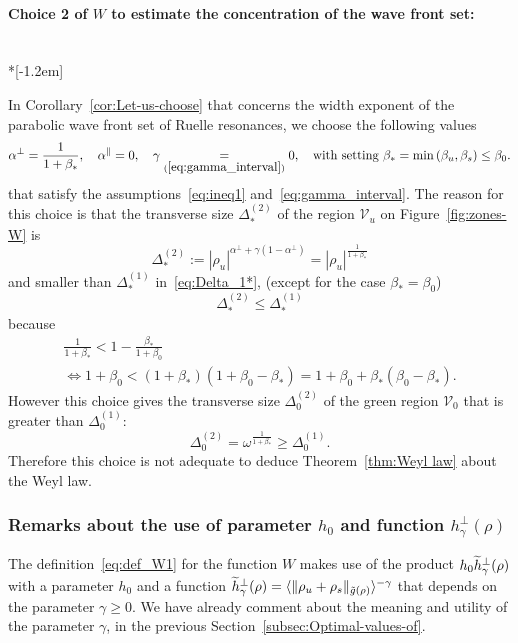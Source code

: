 \documentclass[10pt]{amsart}
\theoremstyle{definition}\newtheorem{defi}[theo]{Definition}\newtheorem{rema}[theo]{Remark}\newtheorem{exam}[theo]{Example}\newtheorem{exem}[theo]{Example}\newtheorem{nota}[theo]{Notation}
\newcommand*\eq[1]{\underset{(#1)}{=}}
\newcommand{\clV}{\mathcal{V}}
\let\oldtilde\tilde
\renewcommand*{\tilde}[1]{\mathchoice{\widetilde{#1}}{\widetilde{#1}}{\oldtilde{#1}}{\oldtilde{#1}}}
\begin{document}
\paragraph{Choice 2 of $W$ to estimate the concentration of the wave front set:}\ \\*[-1.2em]

\noindent In Corollary~\ref{cor:Let-us-choose} that concerns the width exponent of the parabolic wave front set of Ruelle resonances, we choose the following values
\begin{equation}\label{eq:choice_2}
\alpha^{\perp}=\frac{1}{1+\beta_{*}},\quad\alpha^{\parallel}=0,\quad\gamma\eq{\eqref{eq:gamma_interval}}0,\quad\text{with setting }\beta_{*}=\min\left(\beta_{u},\beta_{s}\right)\le\beta_{0}.
\end{equation}
that satisfy the assumptions~\eqref{eq:ineq1} and~\eqref{eq:gamma_interval}. The reason for this choice is that the transverse size $\Delta_{*}^{(2)}$ of the region $\clV_{u}$ on Figure~\ref{fig:zones-W} is
\begin{equation}\label{eq:size_Delta_2*}
\Delta_{*}^{\left(2\right)}:=\left|\rho_{u}\right|^{\alpha^{\perp}+\gamma\left(1-\alpha^{\perp}\right)}=\left|\rho_{u}\right|^{\frac{1}{1+\beta_{*}}}
\end{equation}
and smaller than $\Delta_{*}^{(1)}$ in~\eqref{eq:Delta_1*}, (except for the case $\beta_{*}=\beta_{0}$)
\[
\Delta_{*}^{\left(2\right)}\leq\Delta_{*}^{\left(1\right)}
\]
because
\begin{multline*}
\frac{1}{1+\beta_{*}}<1-\frac{\beta_{*}}{1+\beta_{0}}\\\Longleftrightarrow
1+\beta_{0}<(1+\beta_{*})(1+\beta_{0}-\beta_{*})=1+\beta_{0}+\beta_{*}(\beta_{0}-\beta_{*}).
\end{multline*}
However this choice gives the transverse size $\Delta_{0}^{(2)}$ of the green region $\clV_{0}$ that is greater than $\Delta_{0}^{(1)}$:
\[
\Delta_{0}^{\left(2\right)}=\omega^{\frac{1}{1+\beta_{*}}}\geq\Delta_{0}^{\left(1\right)}.
\]
Therefore this choice is not adequate to deduce Theorem~\ref{thm:Weyl law} about the Weyl law.

\subsubsection{Remarks about the use of parameter \texorpdfstring{$h_{0}$}{h0} and function \texorpdfstring{$h_{\gamma}^{\perp}\left(\rho\right)$}{h gamma perp(rho)}}\label{subsec:Remarks-about-the}

The definition~\eqref{eq:def_W1} for the function $W$ makes use of the product $h_{0}\tilde{h}_{\gamma}^{\perp}(\rho)$ with a parameter $h_{0}$ and a function $\tilde{h}_{\gamma}^{\perp}(\rho)=\langle \Vert \rho_{u}+\rho_{s}\Vert _{\tilde{g}(\rho)}\rangle ^{-\gamma}$ that depends on the parameter $\gamma\geq0$. We have already comment about the meaning and utility of the parameter $\gamma$, in the previous Section~\ref{subsec:Optimal-values-of}.
\end{document}
